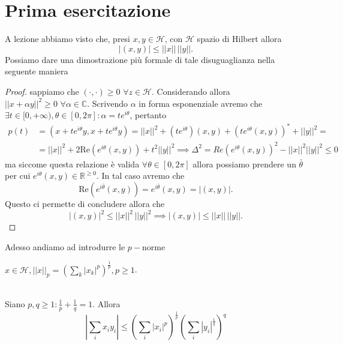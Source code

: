 \documentclass[12pt, twoside, italian, openany]{book}
\begin{document}
	\chapter{Prima esercitazione}

	A lezione abbiamo visto che, presi $x, y \in \mathcal{H}$, con $\mathcal{H}$ spazio di Hilbert allora
	$$
		|(x, y)| \leq ||x|| \, ||y||.
	$$
	Possiamo dare una dimostrazione più formale di tale disuguaglianza nella seguente maniera
	\begin{proof}
		sappiamo che $(\cdot, \cdot) \geq 0 \, \, \forall z \in \mathcal{H}$. Considerando allora $||x+\alpha y||^2 \geq 0 \, \, \forall \alpha \in \mathbb{C}$. Scrivendo $\alpha$ in forma esponenziale avremo che $\exists t \in [0, +\infty), \theta \in [0, 2\pi] : \alpha = te^{i\theta}$, pertanto
		\begin{align*}
			p(t) &= (x + te^{i\theta}y, x + te^{i\theta}y) = ||x||^2 + (te^{i\theta})(x, y) + (te^{i\theta} (x, y))^* + ||y||^2 = \\ 
			&=||x||^2 + 2 \text{Re}(e^{i\theta}(x, y)) + t^2 ||y||^2 \implies \Delta^2 = Re(e^{i \theta}(x, y))^2 - ||x||^2||y||^2 \leq 0
		\end{align*}
		ma siccome questa relazione è valida $\forall \theta \in [0, 2\pi]$ allora possiamo prendere un $\bar{\theta}$ per cui $e^{i\theta}(x, y) \in \mathbb{R}^{\geq 0}.$ In tal caso avremo che
		$$
			\text{Re}(e^{i\bar{\theta}}(x, y)) = e^{i\bar{\theta}}(x, y) = |(x, y)|.
		$$
		Questo ci permette di concludere allora che
		$$
			|(x, y)|^2 \leq ||x||^2 \, ||y||^2 \implies |(x, y)|\leq ||x|| \, ||y||.
		$$
	\end{proof}
	Adesso andiamo ad introdurre le $p-$norme
	\begin{definition}
		$x \in \mathcal{H}, ||x||_p = (\sum_{k} |x_k|^p)^{\frac{1}{p}}, p \geq 1$.
	\end{definition}
	\begin{prop} \hspace{1cm} \\
		Siano $p, q \geq 1 : \frac{1}{p} + \frac{1}{q} = 1$. Allora
		$$|\sum\limits_i x_i y_i| \leq (\sum\limits_i |x_i|^p)^{\frac{1}{p}} (\sum\limits_{i} |y_i|^{\frac{1}{q}})^q$$
	\end{prop}
\end{document}
